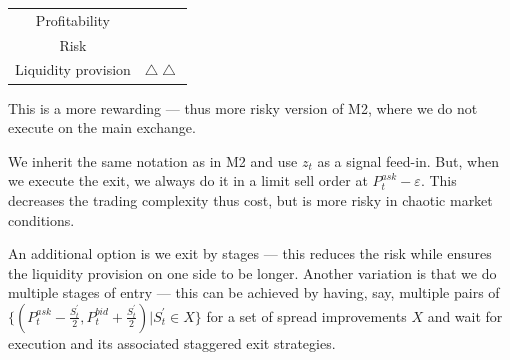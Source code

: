 \documentclass[12pt,a4paper]{article}
\begin{document}
\begin{table}[h]
	\centering
	\begin{tabular}{c|c}
		
		Profitability& \textdollaroldstyle  \textdollaroldstyle \\
		
		Risk & \Radioactivity  \Radioactivity \\
		
		Liquidity provision &$ \bigtriangleup \bigtriangleup$\\
		
	\end{tabular}
\end{table}
This is a more rewarding --- thus more risky version of M2, where we do not execute on the main exchange.

We inherit the same notation as in M2 and use $z_t$ as a signal feed-in. But, when we execute the exit, we always do it in a limit sell order at $P^{ask}_t - \varepsilon$. This decreases the trading complexity thus cost, but is more risky in chaotic market conditions.

An additional option is we exit by stages --- this reduces the risk while ensures the liquidity provision on one side to be longer. Another variation is that we do multiple stages of entry --- this can be achieved by having, say, multiple 
pairs of $\{(P^{ask}_t - \frac{S_t^\prime}{2} , P^{bid}_t + \frac{S_t^\prime}{2}) | S_t^\prime \in X \}$ for a set of spread improvements $X$ and wait for execution and its associated staggered exit strategies. 





\end{document}

